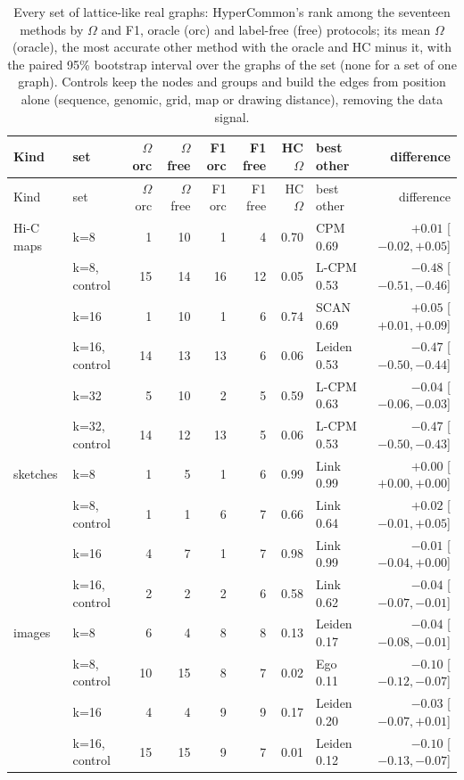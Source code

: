 \begin{longtable*}{llrrrrrlr}
\caption{Every set of lattice-like real graphs: HyperCommon's rank among the seventeen methods by $\Omega$ and F1, oracle (orc) and label-free (free) protocols; its mean $\Omega$ (oracle), the most accurate other method with the oracle and HC minus it, with the paired 95\% bootstrap interval over the graphs of the set (none for a set of one graph). Controls keep the nodes and groups and build the edges from position alone (sequence, genomic, grid, map or drawing distance), removing the data signal.}\label{tab:S-real-lattice-sets}\\
\hline\hline
Kind & set & $\Omega$ orc & $\Omega$ free & F1 orc & F1 free & HC $\Omega$ & best other & difference \\
\hline\endfirsthead
\hline Kind & set & $\Omega$ orc & $\Omega$ free & F1 orc & F1 free & HC $\Omega$ & best other & difference \\ \hline\endhead
\hline\hline\endlastfoot
Hi-C maps & k=8 & 1 & 10 & 1 & 4 & 0.70 & CPM 0.69 & $+0.01$ [$-0.02, +0.05$] \\
 & k=8, control & 15 & 14 & 16 & 12 & 0.05 & L-CPM 0.53 & $-0.48$ [$-0.51, -0.46$] \\
 & k=16 & 1 & 10 & 1 & 6 & 0.74 & SCAN 0.69 & $+0.05$ [$+0.01, +0.09$] \\
 & k=16, control & 14 & 13 & 13 & 6 & 0.06 & Leiden 0.53 & $-0.47$ [$-0.50, -0.44$] \\
 & k=32 & 5 & 10 & 2 & 5 & 0.59 & L-CPM 0.63 & $-0.04$ [$-0.06, -0.03$] \\
 & k=32, control & 14 & 12 & 13 & 5 & 0.06 & L-CPM 0.53 & $-0.47$ [$-0.50, -0.43$] \\
\hline
sketches & k=8 & 1 & 5 & 1 & 6 & 0.99 & Link 0.99 & $+0.00$ [$+0.00, +0.00$] \\
 & k=8, control & 1 & 1 & 6 & 7 & 0.66 & Link 0.64 & $+0.02$ [$-0.01, +0.05$] \\
 & k=16 & 4 & 7 & 1 & 7 & 0.98 & Link 0.99 & $-0.01$ [$-0.04, +0.00$] \\
 & k=16, control & 2 & 2 & 2 & 6 & 0.58 & Link 0.62 & $-0.04$ [$-0.07, -0.01$] \\
\hline
images & k=8 & 6 & 4 & 8 & 8 & 0.13 & Leiden 0.17 & $-0.04$ [$-0.08, -0.01$] \\
 & k=8, control & 10 & 15 & 8 & 7 & 0.02 & Ego 0.11 & $-0.10$ [$-0.12, -0.07$] \\
 & k=16 & 4 & 4 & 9 & 9 & 0.17 & Leiden 0.20 & $-0.03$ [$-0.07, +0.01$] \\
 & k=16, control & 15 & 15 & 9 & 7 & 0.01 & Leiden 0.12 & $-0.10$ [$-0.13, -0.07$] \\

\end{longtable*}
